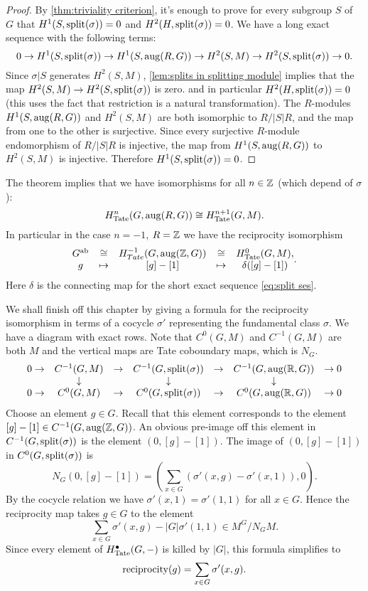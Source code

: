 \begin{proof}
	By \ref{thm:triviality criterion}, it's enough to prove for every subgroup $S$ of $G$ that
	$H^1(S,\mathrm{split}(\sigma))=0$ and $H^2(H,\mathrm{split}(\sigma))=0$.
	We have a long exact sequence with the following terms:
	\[
		0 \to H^1(S,\mathrm{split}(\sigma)) \to H^1(S,\mathrm{aug}(R,G)) \to H^2(S,M) \to H^2(S,\mathrm{split}(\sigma))
		\to 0.
	\]
	Since $\sigma|S$ generates $H^2(S,M)$, \ref{lem:splits in splitting module}
	implies that the map $H^2(S,M) \to H^2(S,\mathrm{split}(\sigma))$ is zero.
	and in particular $H^2(H,\mathrm{split}(\sigma))=0$ (this uses the fact that restriction is a natural
	transformation).
	The $R$-modules $H^1(S,\mathrm{aug}(R,G))$ and $H^2(S,M)$ are both isomorphic to $R / |S|R$,
	and the map from one to the other is surjective.
	Since every surjective $R$-module endomorphism of $R /|S|R$ is injective, the map
	from $H^1(S,\mathrm{aug}(R,G))$ to $H^2(S,M)$ is injective.
	Therefore $H^1(S,\mathrm{split}(\sigma))=0$.
\end{proof}

\begin{definition} \label{def:reciprocity iso}
	The theorem implies that we have isomorphisms for all $n\in {\mathbb Z}$ (which depend of $\sigma$):
	\[
		H^{n}_{\mathrm{Tate}}(G,\mathrm{aug}(R,G)) \cong H^{n+1}_{\mathrm{Tate}}(G,M) .
	\]
	In particular in the case $n = -1$, $R = {\mathbb Z}$ we have the reciprocity isomorphism
	\[
		\begin{matrix}
			G^{\mathrm{ab}} & \cong & H^{-1}_{Tate}(G,\mathrm{aug}({\mathbb Z},G)) &\cong&  H^0_{\mathrm{Tate}}(G,M), \\
			g & \mapsto & [g] - [1] & \mapsto & \delta ([g] - [1])
		\end{matrix}.
	\]
	Here $\delta$ is the connecting map for the short exact sequence \ref{eq:split ses}.
\end{definition}

We shall finish off this chapter by giving a formula for the reciprocity isomorphism in terms of
a cocycle $\sigma'$ representing the fundamental class $\sigma$.
We have a diagram with exact rows.
Note that $C^0(G,M)$ and $C^{-1}(G,M)$ are both $M$ and the vertical maps are Tate coboundary maps,
which is $N_G$.
\[
	\begin{matrix}
		0 \to & C^{-1}(G,M) & \to & C^{-1}(G,\mathrm{split}(\sigma)) & \to & C^{-1}(G,\mathrm{aug}({\mathbb R},G)) & \to 0 \\
		&\downarrow &&\downarrow &&\downarrow \\
		0 \to & C^{0}(G,M) & \to & C^{0}(G,\mathrm{split}(\sigma)) & \to & C^{0}(G,\mathrm{aug}({\mathbb R},G)) & \to 0
	\end{matrix}
\]
Choose an element $g \in G$. Recall that this element corresponds to the element
$[g]-[1] \in C^{-1}(G,\mathrm{aug}({\mathbb Z},G))$.
An obvious pre-image off this element in $C^{-1}(G,\mathrm{split}(\sigma))$ is
the element $(0,[g]-[1])$.
The image of $(0,[g]-[1])$ in $C^{0}(G,\mathrm{split}(\sigma))$ is
\[
	N_G(0,[g]-[1])
	=
	(\sum_{x \in G} (\sigma'(x,g) - \sigma'(x,1)), 0).
\]
By the cocycle relation we have $\sigma'(x,1) = \sigma'(1,1)$ for all $x\in G$.
Hence the reciprocity map takes $g \in G$ to the element
\[
	\sum_{x \in G} \sigma'(x,g) - |G| \sigma'(1,1)
	\in M^G / N_G M.
\]
Since every element of $H^\bullet_{\mathrm{Tate}} (G,-)$ is killed by $|G|$, this formula simplifies to
\[
	\mathrm{reciprocity} (g) = \sum_{x \in G} \sigma'(x,g).
\]

